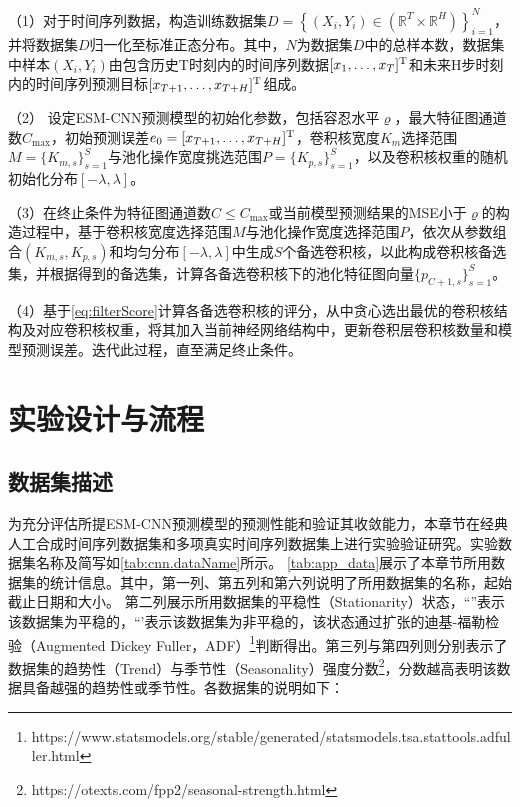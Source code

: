 （1）对于时间序列数据，构造训练数据集$D=\left\{\left(X_{i}, Y_{i}\right) \in\left(\mathbb{R}^{T} \times \mathbb{R}^{H}\right)\right\}_{i=1}^{N}$，并将数据集$D$归一化至标准正态分布。其中，$N$为数据集$D$中的总样本数，数据集中样本$(X_i,Y_i )$由包含历史T时刻内的时间序列数据$[x_1,\ldots,x_T ]^{\operatorname{{\mathrm{T}}}}$和未来H步时刻内的时间序列预测目标$[x_{T+1},\ldots,x_{T+H}]^{\operatorname{{\mathrm{T}}}}$组成。

（2） 设定ESM-CNN预测模型的初始化参数，包括容忍水平$\varrho $，最大特征图通道数$C_{\max}$，初始预测误差$e_0 = [x_{T+1},\ldots,x_{T+H}]^{\operatorname{{\mathrm{T}}}}$，卷积核宽度$K_m$选择范围$M=\{ K_{m,s}\}^S_{s=1}$与池化操作宽度挑选范围$P=\{K_{p,s}\}^S_{s=1}$，以及卷积核权重的随机初始化分布$[-\lambda,\lambda]$。

（3）在终止条件为特征图通道数$C\leq C_{\max}$或当前模型预测结果的MSE小于$\varrho $的构造过程中，基于卷积核宽度选择范围$M$与池化操作宽度选择范围$P$，依次从参数组合$(K_{m,s}, K_{p,s})$和均匀分布$[-\lambda,\lambda]$中生成$S$个备选卷积核，以此构成卷积核备选集，并根据得到的备选集，计算各备选卷积核下的池化特征图向量$\{ p_{C+1,s}\}^S_{s=1}$。

（4）基于\autoref{eq:filterScore}计算各备选卷积核的评分，从中贪心选出最优的卷积核结构及对应卷积核权重，将其加入当前神经网络结构中，更新卷积层卷积核数量和模型预测误差。迭代此过程，直至满足终止条件。


\section{实验设计与流程\label{sec:esm.exp}}
\subsection{数据集描述}
为充分评估所提ESM-CNN预测模型的预测性能和验证其收敛能力，本章节在经典人工合成时间序列数据集和多项真实时间序列数据集上进行实验验证研究。实验数据集名称及简写如\autoref{tab:cnn.dataName}所示。
\autoref{tab:app_data}展示了本章节所用数据集的统计信息。其中，第一列、第五列和第六列说明了所用数据集的名称，起始截止日期和大小。
第二列展示所用数据集的平稳性（Stationarity）状态，“\cmark”表示该数据集为平稳的，“\xmark'表示该数据集为非平稳的，该状态通过扩张的迪基-福勒检验（Augmented Dickey Fuller，ADF）\footnote{https://www.statsmodels.org/stable/generated/statsmodels.tsa.stattools.adfuller.html}判断得出。第三列与第四列则分别表示了数据集的趋势性（Trend）与季节性（Seasonality）强度分数\footnote{https://otexts.com/fpp2/seasonal-strength.html}，分数越高表明该数据具备越强的趋势性或季节性。各数据集的说明如下：

